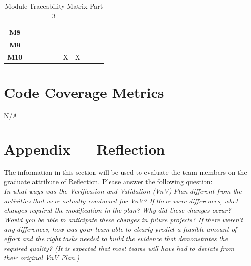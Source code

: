 \documentclass[12pt, titlepage]{article}
\begin{document}
\begin{table}[H]
\begin{tabular}{|c|c|c|c|c|c|c|c|c|c|c|}
    \textbf{M8}  &                       &                       &                       &                     &                     &                     &                                          &                     &                     &                         \\ \hline
    \textbf{M9}  &                       &                       &                       &                     &                     &                     &                                          &                     &                     &                         \\ \hline
    \textbf{M10} &                       &                       &                       &                     &                     & X                   & X                                        &                     &                     &                         \\ \hline
  \end{tabular}
  \caption{Module Traceability Matrix Part 3}
  \label{Table:C_Mod_trace}
\end{table}

\section{Code Coverage Metrics}
N/A
%
%

\newpage{}
\section*{Appendix --- Reflection}

The information in this section will be used to evaluate the team members on the
graduate attribute of Reflection.  Please answer the following question:\\	

\textit{In what ways was the Verification and Validation (VnV) Plan different
        from the activities that were actually conducted for VnV?  If there were
        differences, what changes required the modification in the plan?  Why did
        these changes occur?  Would you be able to anticipate these changes in future
        projects?  If there weren't any differences, how was your team able to clearly
        predict a feasible amount of effort and the right tasks needed to build the
        evidence that demonstrates the required quality?  (It is expected that most
        teams will have had to deviate from their original VnV Plan.)}\\
%
\end{document}
